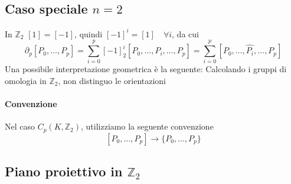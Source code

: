\documentclass[a4paper]{report}
\newcommand{\Z}{\ensuremath{\mathbb{Z}}}
\begin{document}
\subsection{Caso speciale $n=2$}
In $\Z_2$ $[1]=[-1]$, quindi $[-1]^i=[1]\quad\forall i$, da cui
\[
    \partial_p[P_0,\dots,P_p]=\sum_{i=0}^p[-1]_2^i[P_0,\dots,\hat{P_i},\dots,P_p]=\sum_{i=0}^p[P_0,\dots,\hat{P_i},\dots,P_p]
\]
Una possibile interpretazione geometrica è la seguente: Calcolando i gruppi di omologia in $\Z_2$, non distinguo le orientazioni
\paragraph{Convenzione} Nel caso $C_p(K,\Z_2)$, utilizziamo la seguente convenzione
\[
    [P_0,\dots,P_p]\longrightarrow\{P_0,\dots,P_p\}
\]
\subsection{Piano proiettivo in $\Z_2$}
\end{document}
